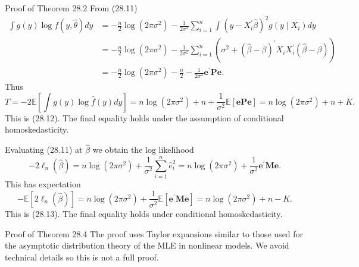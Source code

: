 \documentclass[10pt]{article}
\begin{document}
Proof of Theorem 28.2 From (28.11)
$$
\begin{aligned}
\int g(y) \log f(y, \widehat{\theta}) d y &=-\frac{n}{2} \log \left(2 \pi \sigma^{2}\right)-\frac{1}{2 \sigma^{2}} \sum_{i=1}^{n} \int\left(y-X_{i}^{\prime} \widehat{\beta}\right)^{2} g\left(y \mid X_{i}\right) d y \\
&=-\frac{n}{2} \log \left(2 \pi \sigma^{2}\right)-\frac{1}{2 \sigma^{2}} \sum_{i=1}^{n}\left(\sigma^{2}+(\widehat{\beta}-\beta)^{\prime} X_{i} X_{i}^{\prime}(\widehat{\beta}-\beta)\right) \\
&=-\frac{n}{2} \log \left(2 \pi \sigma^{2}\right)-\frac{n}{2}-\frac{1}{2 \sigma^{2}} \boldsymbol{e}^{\prime} \boldsymbol{P} \boldsymbol{e} .
\end{aligned}
$$
Thus
$$
T=-2 \mathbb{E}\left[\int g(y) \log \widehat{f}(y) d y\right]=n \log \left(2 \pi \sigma^{2}\right)+n+\frac{1}{\sigma^{2}} \mathbb{E}[\boldsymbol{e} \boldsymbol{P} \boldsymbol{e}]=n \log \left(2 \pi \sigma^{2}\right)+n+K .
$$
This is (28.12). The final equality holds under the assumption of conditional homoskedasticity.

Evaluating (28.11) at $\widehat{\beta}$ we obtain the log likelihood
$$
-2 \ell_{n}(\widehat{\beta})=n \log \left(2 \pi \sigma^{2}\right)+\frac{1}{\sigma^{2}} \sum_{i=1}^{n} \widehat{e}_{i}^{2}=n \log \left(2 \pi \sigma^{2}\right)+\frac{1}{\sigma^{2}} \boldsymbol{e}^{\prime} \boldsymbol{M} \boldsymbol{e} .
$$
This has expectation
$$
-\mathbb{E}\left[2 \ell_{n}(\widehat{\beta})\right]=n \log \left(2 \pi \sigma^{2}\right)+\frac{1}{\sigma^{2}} \mathbb{E}\left[\boldsymbol{e}^{\prime} \boldsymbol{M e}\right]=n \log \left(2 \pi \sigma^{2}\right)+n-K .
$$
This is (28.13). The final equality holds under conditional homoskedasticity.

Proof of Theorem 28.4 The proof uses Taylor expansions similar to those used for the asymptotic distribution theory of the MLE in nonlinear models. We avoid technical details so this is not a full proof.
\end{document}
